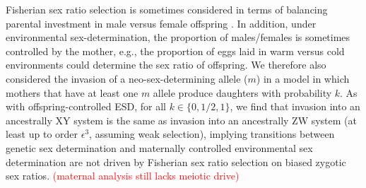 \documentclass[12pt]{article}
\begin{document}


Fisherian sex ratio selection is sometimes considered in terms of balancing parental investment in male versus female offspring \citep{Charnov:1982wg}.
In addition, under environmental sex-determination, the proportion of males/females is sometimes controlled by the mother, e.g., the proportion of eggs laid in warm versus cold environments could determine the sex ratio of offspring. 
We therefore also considered the invasion of a neo-sex-determining allele ($m$) in a model in which mothers that have at least one $m$ allele produce daughters with probability $k$. 
As with offspring-controlled ESD, for all $k\in\{0,1/2,1\}$, we find that invasion into an ancestrally XY system is the same as invasion into an ancestrally ZW system (at least up to order $\epsilon^3$, assuming weak selection), implying transitions between genetic sex determination and maternally controlled environmental sex determination are not driven by Fisherian sex ratio selection on biased zygotic sex ratios.
\textcolor{red}{(maternal analysis still lacks meiotic drive)}
\end{document}
